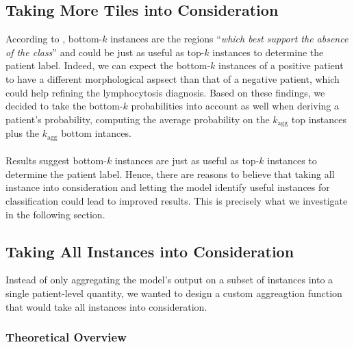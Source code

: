 \documentclass[final]{cvpr}
\begin{document}
	\subsection{Taking More Tiles into Consideration}
	\label{topbottom}
	
	According to \cite{owkin}, bottom-$k$ instances are the regions “\textit{which best support the absence of the class}” and could be just as useful as top-$k$ instances to determine the patient label. Indeed, we can expect the bottom-$k$ instances of a positive patient to have a different morphological aspsect than that of a negative patient, which could help refining the lymphocytosis diagnosis. Based on these findings, we decided to take the bottom-$k$ probabilities into account as well when deriving a patient's probability, computing the average probability on the $k_{\text{agg}}$ top instances plus the $k_{\text{agg}}$ bottom intances.\\
	\\
	Results suggest bottom-$k$ instances are just as useful as top-$k$ instances to determine the patient label. Hence, there are reasons to believe that taking all instance into consideration and letting the model identify useful instances for classification could lead to improved results. This is precisely what we investigate in the following section.
	
	\subsection{Taking All Instances into Consideration}
	
	Instead of only aggregating the model's output on a subset of instances into a single patient-level quantity, we wanted to design a custom aggreagtion function that would take all instances into consideration.
	
	\subsubsection{Theoretical Overview}
	
\end{document}
